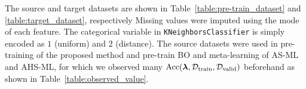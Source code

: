The source and target datasets are shown in Table~\ref{table:pre-train_dataset} and \ref{table:target_dataset}, respectively
%
Missing values were imputed using the mode of each feature.
%
The categorical variable in {\tt KNeighborsClassifier} is simply encoded as $1$ (uniform) and $2$ (distance).
%
The source datasets were used in pre-training of the proposed method and pre-train BO and meta-learning of AS-ML and AHS-ML, for which we observed many $\mathrm{Acc}(\boldsymbol{\lambda}, {\mathcal D}_{\mathrm{train}}, {\mathcal D}_{\mathrm{valid}})$ beforehand as shown in Table~\ref{table:observed_value}.

%

